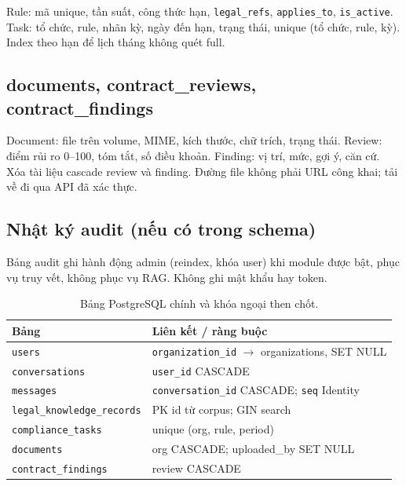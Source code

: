 Rule: mã unique, tần suất, công thức hạn, \texttt{legal\_refs},
\texttt{applies\_to}, \texttt{is\_active}. Task: tổ chức, rule, nhãn kỳ, ngày
đến hạn, trạng thái, unique (tổ chức, rule, kỳ). Index theo hạn để lịch tháng
không quét full.

\subsection{documents, contract\_reviews, contract\_findings}

Document: file trên volume, MIME, kích thước, chữ trích, trạng thái. Review: điểm
rủi ro 0--100, tóm tắt, số điều khoản. Finding: vị trí, mức, gợi ý, căn cứ. Xóa
tài liệu cascade review và finding. Đường file không phải URL công khai; tải về
đi qua API đã xác thực.

\subsection{Nhật ký audit (nếu có trong schema)}

Bảng audit ghi hành động admin (reindex, khóa user) khi module được bật, phục vụ
truy vết, không phục vụ RAG. Không ghi mật khẩu hay token.

\begin{table}[htp]
\centering
\caption{Bảng PostgreSQL chính và khóa ngoại then chốt.}
\label{tab:bang-pg}
\begin{tabular}{p{4.4cm}p{9.3cm}}
\toprule
\textbf{Bảng} & \textbf{Liên kết / ràng buộc} \\
\midrule
\texttt{users} & \texttt{organization\_id} $\rightarrow$ organizations, SET NULL \\
\texttt{conversations} & \texttt{user\_id} CASCADE \\
\texttt{messages} & \texttt{conversation\_id} CASCADE; \texttt{seq} Identity \\
\texttt{legal\_knowledge\_records} & PK id từ corpus; GIN search \\
\texttt{compliance\_tasks} & unique (org, rule, period) \\
\texttt{documents} & org CASCADE; uploaded\_by SET NULL \\
\texttt{contract\_findings} & review CASCADE \\
\bottomrule
\end{tabular}
\end{table}
